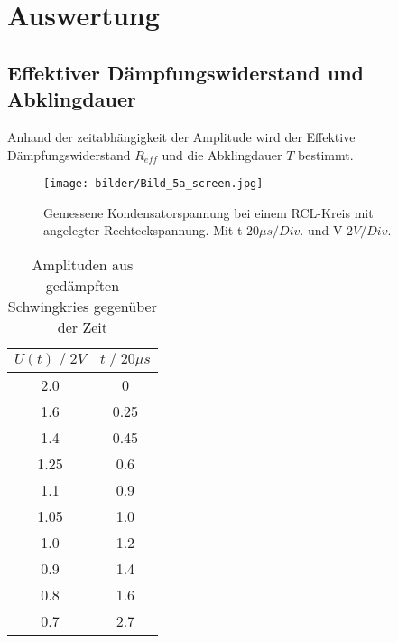\newpage
\section{Auswertung}
\subsection{Effektiver Dämpfungswiderstand und Abklingdauer}
Anhand der zeitabhängigkeit der Amplitude wird der Effektive Dämpfungswiderstand $R_{eff}$
und die Abklingdauer $T$ bestimmt. 
\begin{figure}
    \centering
    \texttt{[image: bilder/Bild\_5a\_screen.jpg]}
    \caption{
        Gemessene Kondensatorspannung bei einem RCL-Kreis mit angelegter Rechteckspannung. 
        Mit t $20\mu s/Div.$ und V $ 2V/Div.$
        }
    \label{fig:bild1}
\end{figure}

\begin{table}
    \centering
    \begin{tabular}{c c}
        \toprule
        $U(t)\;/\;2V$ & $t\;/\;20\mu s$\\
        \midrule
        2.0     &0   \\
        1.6     &0.25\\
        1.4     &0.45\\
        1.25    &0.6\\
        1.1     &0.9\\
        1.05    &1.0\\
        1.0     &1.2\\
        0.9     &1.4\\
        0.8     &1.6\\
        0.7     &2.7\\
        \bottomrule
    \end{tabular}
    \caption{Amplituden aus gedämpften Schwingkries gegenüber der Zeit}
    \label{tab:tabelle1}
\end{table}

